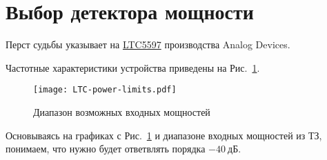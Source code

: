 \section{Выбор детектора мощности}

Перст судьбы указывает на \href{https://www.analog.com/en/products/ltc5597.html}{LTC5597} производства Analog Devices. 

Частотные характеристики устройства приведены на Рис.~\ref{fig:LTC_response}.

\begin{figure}[!ht]
		\centering
		\texttt{[image: LTC-power-limits.pdf]}
	\caption{Диапазон возможных входных мощностей}%
	\label{fig:LTC_response}
\end{figure}

Основываясь на графиках с  Рис.~\ref{fig:LTC_response} и диапазоне входных мощностей из ТЗ, понимаем, 
что нужно будет ответвлять порядка $-40~\text{дБ}$. 



